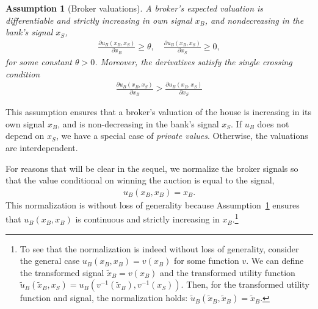 \documentclass[11pt,twopage]{article}
\newtheorem{assumption}{Assumption}
{\bf}{\it}
\begin{document}
\begin{assumption}[Broker valuations]\label{as:valuations}
  A broker's expected valuation is differentiable and strictly
  increasing in own signal $x_B$, and nondecreasing in the bank's
  signal $x_S$,
  \begin{align}
    \frac{\partial u_B(x_B,x_S)}{\partial x_B}\geq \theta,\quad
    \frac{\partial u_B(x_B,x_S)}{\partial x_S} \geq 0, \nonumber
  \end{align}
  for some constant $\theta>0$.  Moreover, the derivatives satisfy the
  \emph{single crossing} condition
  \begin{align}
    \frac{\partial u_B(x_B,x_S)}{\partial x_B}>\frac{\partial
      u_B(x_B,x_S)}{\partial x_S} \nonumber
  \end{align}

  \label{as:utilities}
\end{assumption}




This assumption ensures that a broker's valuation of the house is
increasing in its own signal $x_B$, and is non-decreasing in the
bank's signal $x_S$. If $u_B$ does not depend on $x_S$, we have a
special case of \emph{private values}. Otherwise, the valuations are
interdependent.



For reasons that will be clear in the sequel, we normalize the broker
signals so that the value conditional on winning the auction is equal
to the signal,
\begin{align}
  u_B(x_B,x_B) = x_B.
  \label{bnorm}
\end{align}
This normalization is without loss of generality because Assumption~\ref{as:valuations} 
ensures that $u_B(x_B,x_B)$ is continuous and
strictly increasing in $x_B$.\footnote{To see that the normalization is
indeed without loss of generality, consider the general case
$u_B(x_B,x_B)=v(x_B)$ for some function $v$. We can define the transformed signal
$\tilde x_B=v(x_B)$ and the transformed utility function 
$\tilde u_B(\tilde x_B,x_S)=u_B(v^{-1}(\tilde x_B),v^{-1}(x_S))$. Then, for the transformed
utility function and signal, the normalization holds: 
$\tilde u_B(\tilde x_B,\tilde x_B)=\tilde x_B$.}
\end{document}
